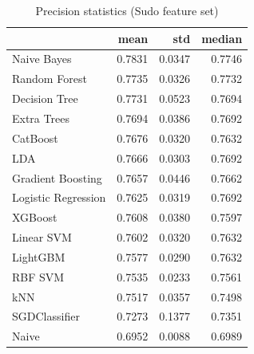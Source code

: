 \begin{table}
\caption{Precision statistics (Sudo feature set)}
\label{tab:precision_Sudo_stats}
\begin{tabular}{lrrr}
\toprule
 & mean & std & median \\
\midrule
Naive Bayes & 0.7831 & 0.0347 & 0.7746 \\
Random Forest & 0.7735 & 0.0326 & 0.7732 \\
Decision Tree & 0.7731 & 0.0523 & 0.7694 \\
Extra Trees & 0.7694 & 0.0386 & 0.7692 \\
CatBoost & 0.7676 & 0.0320 & 0.7632 \\
LDA & 0.7666 & 0.0303 & 0.7692 \\
Gradient Boosting & 0.7657 & 0.0446 & 0.7662 \\
Logistic Regression & 0.7625 & 0.0319 & 0.7692 \\
XGBoost & 0.7608 & 0.0380 & 0.7597 \\
Linear SVM & 0.7602 & 0.0320 & 0.7632 \\
LightGBM & 0.7577 & 0.0290 & 0.7632 \\
RBF SVM & 0.7535 & 0.0233 & 0.7561 \\
kNN & 0.7517 & 0.0357 & 0.7498 \\
SGDClassifier & 0.7273 & 0.1377 & 0.7351 \\
Naive & 0.6952 & 0.0088 & 0.6989 \\
\bottomrule
\end{tabular}
\end{table}
